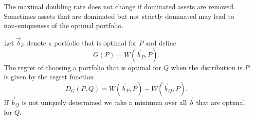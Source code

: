 \documentclass[10pt,a4paper,draft]{article}
\begin{document}
The maximal doubling rate does not change if dominated assets are removed. Sometimes assets that are dominated but not
strictly dominated may lead to non-uniqueness of the optimal portfolio. 


Let $\vec{b}_{P}$ denote a portfolio that is optimal for $P$ and define 
\begin{equation}
G(P) =W\left(\vec{b}_{P},P\right).\label{eq:G}
\end{equation}
The regret of choosing a portfolio that is optimal for $Q$ when the
distribution is $P$ is given by the regret function
\begin{equation}
D_G (P,Q)=W\left(\vec{b}_{P},P\right)-W\left(\vec{b}_{Q},P\right).\label{eq:Bregman}
\end{equation}
If $\vec{b}_{Q}$ is not uniquely determined we take a minimum
over all $\vec{b}$ that are optimal for $Q.$
\end{document}
